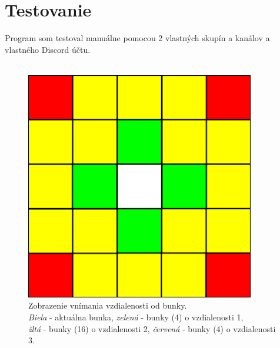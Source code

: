 \documentclass[a4paper,12pt]{article}
\begin{document}
\section{Testovanie}
Program som testoval manuálne pomocou 2 vlastných skupín a kanálov a vlastného Discord účtu. 
\\\\
\begin{figure}[htp]
    \centering
    \includegraphics[width=10cm]{neighbor_radius.png}
    \captionsetup{justification=centering,margin=2cm}
    \caption{Zobrazenie vnímania vzdialenosti od bunky.\\\textit{Biela} - aktuálna bunka, \textit{zelená} - bunky (4) o vzdialenosti 1,\\\textit{žltá} - bunky (16) o vzdialenosti 2, \textit{červená} - bunky (4) o vzdialenosti 3.}
    \label{fig:neighbor_radius}
\end{figure}
\end{document}
